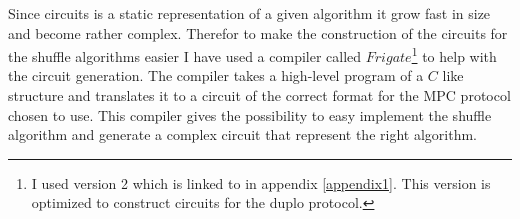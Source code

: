 \documentclass[twoside,11pt,openright]{report}
\begin{document}
\begin{table}
\label{truth_table}
\centering
{}
\caption{A table of the 16 different gate types that can be used in a circuit of the type used in duplo}
\end{table}

Since circuits is a static representation of a given algorithm it grow fast in size and become rather complex. Therefor to make the construction of the circuits for the shuffle algorithms easier I have used a compiler called $Frigate$\footnote{I used version 2 which is linked to in appendix \ref{appendix1}. This version is optimized to construct circuits for the duplo protocol.} to help with the circuit generation. The compiler takes a high-level program of a $C$ like structure and translates it to a circuit of the correct format for the MPC protocol chosen to use. This compiler gives the possibility to easy implement the shuffle algorithm and generate a complex circuit that represent the right algorithm.
\end{document}
